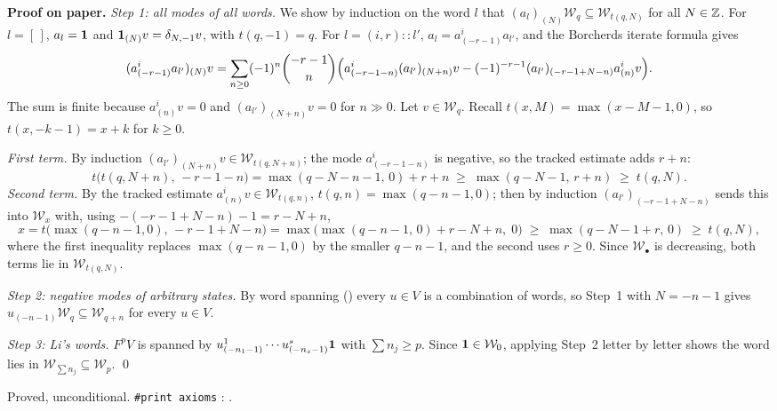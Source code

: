 \textbf{Proof on paper.} \emph{Step 1: all modes of all words.} We show by induction on the word $l$ that
$(a_l)_{(N)}\mathcal W_q\subseteq \mathcal W_{t(q,N)}$ for all $N\in{\mathbb{Z}}$. For $l=[\,]$, $a_l = \mathbf{1}$ and $\mathbf{1}_{(N)}v = \delta_{N,-1}v$,
with $t(q,-1) = q$. For $l = (i,r)::l'$, $a_l = a^i_{(-r-1)}a_{l'}$, and the Borcherds iterate formula gives
\begin{equation*}
  (a^i_{(-r-1)}a_{l'})_{(N)}v = \sum_{n\ge0}(-1)^n\binom{-r-1}{n}
  \Bigl(a^i_{(-r-1-n)}(a_{l'})_{(N+n)}v - (-1)^{-r-1}(a_{l'})_{(-r-1+N-n)}a^i_{(n)}v\Bigr).
\end{equation*}
The sum is finite because $a^i_{(n)}v = 0$ and $(a_{l'})_{(N+n)}v=0$ for $n\gg0$. Let $v\in\mathcal W_q$. Recall
$t(x,M) = \max(x-M-1,0)$, so $t(x,-k-1) = x+k$ for $k\ge0$.

\emph{First term.} By induction $(a_{l'})_{(N+n)}v\in\mathcal W_{t(q,N+n)}$; the mode $a^i_{(-r-1-n)}$ is negative, so the
tracked estimate adds $r+n$:
\begin{equation*}
  t\bigl(t(q,N+n),\,-r-1-n\bigr) = \max(q-N-n-1,\,0)+r+n \;\ge\; \max(q-N-1,\,r+n) \;\ge\; t(q,N).
\end{equation*}
\emph{Second term.} By the tracked estimate $a^i_{(n)}v\in\mathcal W_{t(q,n)}$, $t(q,n) = \max(q-n-1,0)$; then by induction
$(a_{l'})_{(-r-1+N-n)}$ sends this into $\mathcal W_{x}$ with, using $-(-r-1+N-n)-1 = r-N+n$,
\begin{equation*}
  x = t\bigl(\max(q-n-1,0),\,-r-1+N-n\bigr) = \max\bigl(\max(q-n-1,\,0)+r-N+n,\;0\bigr)
  \;\ge\; \max(q-N-1+r,\,0) \;\ge\; t(q,N),
\end{equation*}
where the first inequality replaces $\max(q-n-1,0)$ by the smaller $q-n-1$, and the second uses $r\ge0$. Since
$\mathcal W_\bullet$ is decreasing, both terms lie in $\mathcal W_{t(q,N)}$.

\emph{Step 2: negative modes of arbitrary states.} By word spanning () every $u\in V$ is a combination of words, so
Step~1 with $N=-n-1$ gives $u_{(-n-1)}\mathcal W_q\subseteq \mathcal W_{q+n}$ for every $u\in V$.

\emph{Step 3: Li's words.} $F^pV$ is spanned by $u^1_{(-n_1-1)}\cdots u^s_{(-n_s-1)}\mathbf{1}$ with $\sum n_j\ge p$. Since
$\mathbf{1}\in \mathcal W_0$, applying Step~2 letter by letter shows the word lies in $\mathcal W_{\sum n_j}\subseteq \mathcal W_p$. \qed

\begin{status}
Proved, unconditional. \texttt{\#print axioms}
\allowbreak{}\allowbreak{}\allowbreak{}: \lean{[propext, Classical.}\allowbreak{}\allowbreak\lean{sound]}.
\end{status}

